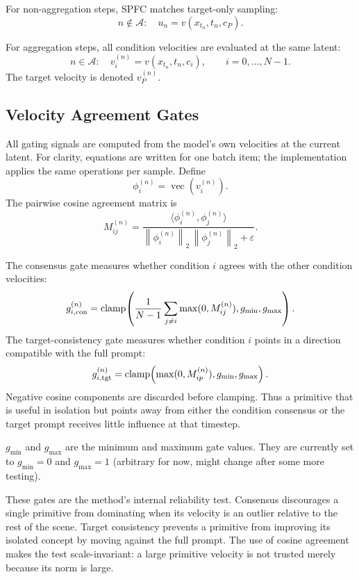 \documentclass[letterpaper]{article} %
\newcommand{\vect}[1]{\operatorname{vec}(#1)}
\newcommand{\clamp}{\operatorname{clamp}}
\newcommand{\norm}[1]{\left\lVert #1 \right\rVert_2}
\newcommand{\eps}{\varepsilon}
\begin{document}
For non-aggregation steps, SPFC matches target-only sampling:
\[
n\notin\mathcal{A}:\quad
u_n=v(x_{t_n},t_n,c_P).
\]

For aggregation steps, all condition velocities are evaluated at the same latent:
\[
n\in\mathcal{A}:\quad
v_i^{(n)}=v(x_{t_n},t_n,c_i),
\qquad i=0,\ldots,N-1.
\]
The target velocity is denoted $v_P^{(n)}$.


\subsection{Velocity Agreement Gates}

All gating signals are computed from the model's own velocities at the
current latent. For clarity, equations are written for one batch item;
the implementation applies the same operations per sample. Define
\begin{equation}
\phi_i^{(n)}=\vect{v_i^{(n)}}.
\end{equation}
The pairwise cosine agreement matrix is
\begin{equation}
M_{ij}^{(n)}
=
\frac{\langle \phi_i^{(n)},\phi_j^{(n)}\rangle}
{\norm{\phi_i^{(n)}}\,\norm{\phi_j^{(n)}}+\eps}.
\end{equation}

The consensus gate measures whether condition $i$ agrees with the
other condition velocities:
\begin{equation}
g_{i,{\rm con}}^{(n)}
=
\clamp\!\left(
\frac{1}{N-1}\sum_{j\neq i}\max(0,M_{ij}^{(n)}),
g_{\min},g_{\max}
\right).
\end{equation}
The target-consistency gate measures whether condition $i$ points in a
direction compatible with the full prompt:
\begin{equation}
g_{i,{\rm tgt}}^{(n)}
=
\clamp\!\left(\max(0,M_{ip}^{(n)}),g_{\min},g_{\max}\right).
\end{equation}
Negative cosine components are discarded before clamping. Thus a
primitive that is useful in isolation but points away from either the
condition consensus or the target prompt receives little influence at
that timestep.

$g_{\min}$ and $g_{\max}$ are the minimum and maximum gate values. They are currently set to $g_{\min}=0$ and $g_{\max}=1$ (arbitrary for now, might change after some more testing).

These gates are the method's internal reliability test. Consensus
discourages a single primitive from dominating when its velocity is an
outlier relative to the rest of the scene. Target consistency prevents a
primitive from improving its isolated concept by moving against the full
prompt. The use of cosine agreement makes the test scale-invariant: a
large primitive velocity is not trusted merely because its norm is
large.
\end{document}
